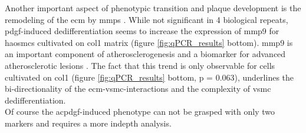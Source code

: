 Another important aspect of phenotypic transition and plaque development is the remodeling of the \ac{ecm} by \acp{mmp} \cite{johnsonMetalloproteinasesAtherosclerosis2017}. While not significant in 4 biological repeats, \ac{pdgf}-induced dedifferentiation seems to increase the expression of \ac{mmp9} for \acp{haosmc} cultivated on \ac{col1} matrix (figure \ref{fig:qPCR_results} bottom). \ac{mmp9} is an important component of atherosclerogenesis \cite{galisIncreasedExpressionMatrix1994} and a biomarker for advanced atherosclerotic lesions \cite{langleyExtracellularMatrixProteomics2017}. The fact that this trend is only observable for cells cultivated on \ac{col1} (figure \ref{fig:qPCR_results} bottom, p = 0.063), underlines the bi-directionality of the \ac{ecm}-\ac{vsmc}-interactions and the complexity of \ac{vsmc} dedifferentiation.\\
Of course the ac{pdgf}-induced phenotype can not be grasped with only two markers and requires a more indepth analysis.


